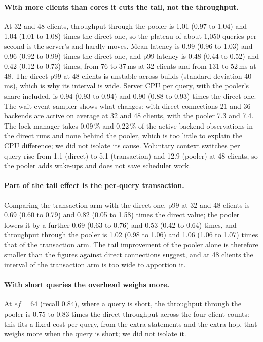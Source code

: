 \documentclass[preprint,12pt]{elsarticle}
\begin{document}
\paragraph{With more clients than cores it cuts the tail, not the throughput.} At 32 and 48 clients, throughput through the pooler is
1.01 (0.97 to 1.04) and 1.04 (1.01 to 1.08) times the direct one, so the plateau of about 1{,}050 queries per second is the server's and
hardly moves. Mean latency is 0.99 (0.96 to 1.03) and 0.96 (0.92 to 0.99) times the direct one, and p99 latency is 0.48 (0.44 to 0.52) and 0.42 (0.12 to 0.73)
times, from 76 to 37\,ms at 32 clients and from 131 to 52\,ms at 48. The direct p99
at 48 clients is unstable across builds (standard deviation 40\,ms), which is why its interval is wide. Server CPU per query,
with the pooler's share included, is 0.94 (0.93 to 0.94) and 0.90 (0.88 to 0.93) times the direct one. The wait-event sampler shows what changes:
with direct connections 21 and 36 backends are active on average at 32 and 48 clients, with the
pooler 7.3 and 7.4. The lock manager takes 0.09\,\% and 0.22\,\% of the active-backend observations in the direct
runs and none behind the pooler, which is too little to explain the CPU difference; we did not isolate its cause. Voluntary context
switches per query rise from 1.1 (direct) to 5.1 (transaction) and 12.9 (pooler) at 48 clients, so the pooler adds wake-ups
and does not save scheduler work.

\paragraph{Part of the tail effect is the per-query transaction.} Comparing the transaction arm with the direct one, p99 at 32 and
48 clients is 0.69 (0.60 to 0.79) and 0.82 (0.05 to 1.58) times the direct value; the pooler lowers it by a further 0.69 (0.63 to 0.76) and 0.53 (0.42 to 0.64)
times, and throughput through the pooler is 1.02 (0.98 to 1.06) and 1.06 (1.06 to 1.07) times that of the transaction arm. The tail
improvement of the pooler alone is therefore smaller than the figures against direct connections suggest, and at 48 clients the
interval of the transaction arm is too wide to apportion it.

\paragraph{With short queries the overhead weighs more.} At $ef=64$ (recall 0.84), where a query is short, the throughput
through the pooler is 0.75 to 0.83 times the direct throughput across the four client counts: this
fits a fixed cost per query, from the extra statements and the extra hop, that weighs more when the query is short; we did not isolate it.
\end{document}
